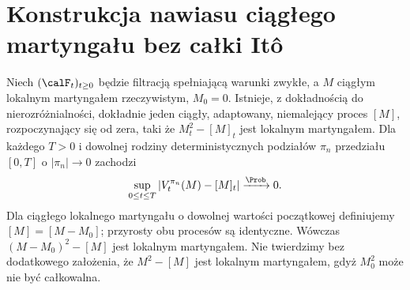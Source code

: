 \section{Konstrukcja nawiasu ciągłego martyngału bez całki Itô}
\begin{twierdzenie}
\label{thm:general-bracket}
Niech $(\calF_t)_{t\ge0}$ będzie filtracją
spełniającą warunki zwykłe,
a $M$ ciągłym lokalnym martyngałem rzeczywistym,
$M_0=0$. Istnieje, z dokładnością do nierozróżnialności, dokładnie jeden
ciągły, adaptowany, niemalejący proces $[M]$, rozpoczynający się od zera,
taki że $M_t^2-[M]_t$ jest lokalnym martyngałem.
Dla każdego $T>0$ i dowolnej rodziny deterministycznych
podziałów $\pi_n$ przedziału $[0,T]$ o
$|\pi_n|\to0$ zachodzi
\[
\sup_{0\le t\le T}|V_t^{\pi_n}(M)-[M]_t|
\xrightarrow{\Prob}0.
\]
Dla ciągłego lokalnego martyngału o dowolnej
wartości początkowej definiujemy $[M]=[M-M_0]$;
przyrosty obu procesów są identyczne.
Wówczas $(M-M_0)^2-[M]$ jest lokalnym martyngałem.
Nie twierdzimy bez dodatkowego założenia,
że $M^2-[M]$ jest lokalnym martyngałem,
gdyż $M_0^2$ może nie być całkowalna.
\end{twierdzenie}

